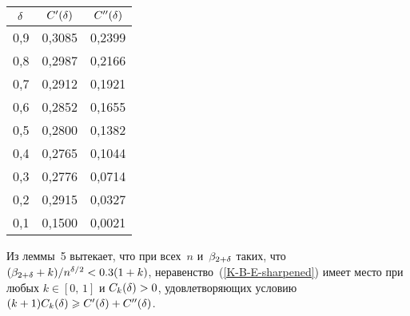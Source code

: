 \begin{multicols}{2}
\begin{center}
{\small 
\tabcolsep=16.1pt
\begin{tabular}{|c|c|c|}
\hline
$\delta$ & $C'(\delta)$ & $C''(\delta)$ \\
\hline
0,9 & 0,3085 & 0,2399  \\
0,8 & 0,2987 & 0,2166  \\
0,7 & 0,2912 & 0,1921  \\
0,6 & 0,2852 & 0,1655  \\
0,5 & 0,2800 & 0,1382  \\
0,4 & 0,2765 & 0,1044  \\
0,3 & 0,2776 & 0,0714  \\
0,2 & 0,2915 & 0,0327  \\
0,1 & 0,1500 & 0,0021  \\
  \hline
\end{tabular}
}
\end{center}

\addtocounter{table}{1}


Из леммы~5 вытекает, что при всех~$n$ и~$\beta_{2+\delta}$
таких, что ${(\beta_{2+\delta}+k)/n^{\delta/2}<0.3(1+k)}$,
неравенство~(\ref{K-B-E-sharpened}) имеет место при любых
$k\in[0,\,1]$ и $C_k(\delta)>0$, удовлетворяющих условию
$(k+1)C_k(\delta) \geqslant C'(\delta) + C''(\delta)$.


\end{multicols}
